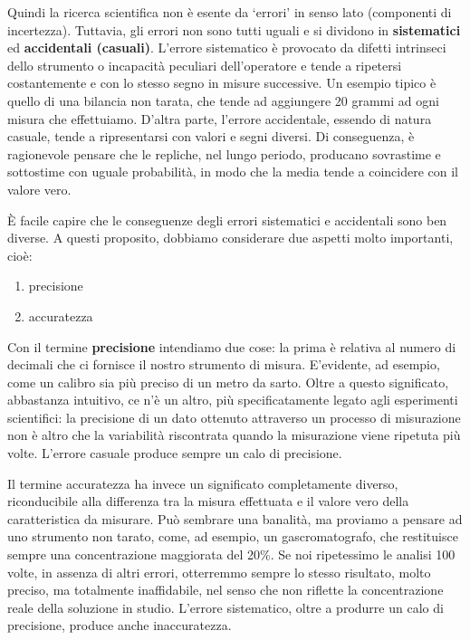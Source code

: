 \documentclass[a4paper,12pt,oneside]{book}
\providecommand{\tightlist}{%
  \setlength{\itemsep}{0pt}\setlength{\parskip}{0pt}}
\begin{document}
Quindi la ricerca scientifica non è esente da `errori' in senso lato (componenti di incertezza). Tuttavia, gli errori non sono tutti uguali e si dividono in \textbf{sistematici} ed \textbf{accidentali (casuali)}. L'errore sistematico è provocato da difetti intrinseci dello strumento o incapacità peculiari dell'operatore e tende a ripetersi costantemente e con lo stesso segno in misure successive. Un esempio tipico è quello di una bilancia non tarata, che tende ad aggiungere 20 grammi ad ogni misura che effettuiamo. D'altra parte, l'errore accidentale, essendo di natura casuale, tende a ripresentarsi con valori e segni diversi. Di conseguenza, è ragionevole pensare che le repliche, nel lungo periodo, producano sovrastime e sottostime con uguale probabilità, in modo che la media tende a coincidere con il valore vero.

È facile capire che le conseguenze degli errori sistematici e accidentali sono ben diverse. A questi proposito, dobbiamo considerare due aspetti molto importanti, cioè:

\begin{enumerate}
\def\labelenumi{\arabic{enumi}.}
\tightlist
\item
  precisione
\item
  accuratezza
\end{enumerate}

Con il termine \textbf{precisione} intendiamo due cose: la prima è relativa al numero di decimali che ci fornisce il nostro strumento di misura. E'evidente, ad esempio, come un calibro sia più preciso di un metro da sarto. Oltre a questo significato, abbastanza intuitivo, ce n'è un altro, più specificatamente legato agli esperimenti scientifici: la precisione di un dato ottenuto attraverso un processo di misurazione non è altro che la variabilità riscontrata quando la misurazione viene ripetuta più volte. L'errore casuale produce sempre un calo di precisione.

Il termine accuratezza ha invece un significato completamente diverso, riconducibile alla differenza tra la misura effettuata e il valore vero della caratteristica da misurare. Può sembrare una banalità, ma proviamo a pensare ad uno strumento non tarato, come, ad esempio, un gascromatografo, che restituisce sempre una concentrazione maggiorata del 20\%. Se noi ripetessimo le analisi 100 volte, in assenza di altri errori, otterremmo sempre lo stesso risultato, molto preciso, ma totalmente inaffidabile, nel senso che non riflette la concentrazione reale della soluzione in studio. L'errore sistematico, oltre a produrre un calo di precisione, produce anche inaccuratezza.
\end{document}
